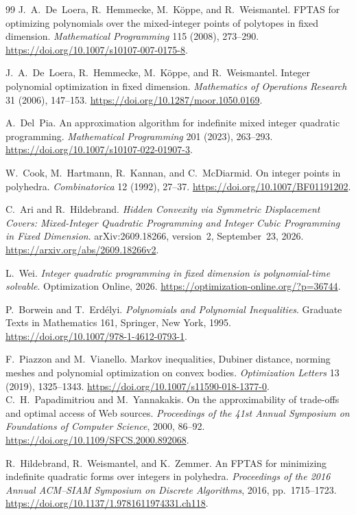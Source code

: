 \documentclass[11pt]{article}
\theoremstyle{definition}\newtheorem{definition}{Definition}[section]
\theoremstyle{remark}\newtheorem{remark}[theorem]{Remark}
\begin{document}
\begin{thebibliography}{99}
 J.~A.~De~Loera, R.~Hemmecke, M.~K\"oppe, and R.~Weismantel.
FPTAS for optimizing polynomials over the mixed-integer points of polytopes in fixed dimension.
\emph{Mathematical Programming} 115 (2008), 273--290.
\url{https://doi.org/10.1007/s10107-007-0175-8}.

 J.~A.~De~Loera, R.~Hemmecke, M.~K\"oppe, and R.~Weismantel.
Integer polynomial optimization in fixed dimension.
\emph{Mathematics of Operations Research} 31 (2006), 147--153.
\url{https://doi.org/10.1287/moor.1050.0169}.

 A.~Del~Pia.
An approximation algorithm for indefinite mixed integer quadratic programming.
\emph{Mathematical Programming} 201 (2023), 263--293.
\url{https://doi.org/10.1007/s10107-022-01907-3}.

 W.~Cook, M.~Hartmann, R.~Kannan, and C.~McDiarmid.
On integer points in polyhedra.
\emph{Combinatorica} 12 (1992), 27--37.
\url{https://doi.org/10.1007/BF01191202}.

 C.~Ari and R.~Hildebrand.
\emph{Hidden Convexity via Symmetric Displacement Covers: Mixed-Integer Quadratic Programming and Integer Cubic Programming in Fixed Dimension}.
arXiv:2609.18266, version~2, September~23, 2026.
\url{https://arxiv.org/abs/2609.18266v2}.

 L.~Wei.
\emph{Integer quadratic programming in fixed dimension is polynomial-time solvable}.
Optimization Online, 2026.
\url{https://optimization-online.org/?p=36744}.

 P.~Borwein and T.~Erd\'elyi.
\emph{Polynomials and Polynomial Inequalities}. Graduate Texts in Mathematics 161, Springer, New York, 1995.
\url{https://doi.org/10.1007/978-1-4612-0793-1}.

 F.~Piazzon and M.~Vianello.
Markov inequalities, Dubiner distance, norming meshes and polynomial optimization on convex bodies.
\emph{Optimization Letters} 13 (2019), 1325--1343.
\url{https://doi.org/10.1007/s11590-018-1377-0}.
 C.~H.~Papadimitriou and M.~Yannakakis.
On the approximability of trade-offs and optimal access of Web sources.
\emph{Proceedings of the 41st Annual Symposium on Foundations of Computer Science}, 2000, 86--92.
\url{https://doi.org/10.1109/SFCS.2000.892068}.

 R.~Hildebrand, R.~Weismantel, and K.~Zemmer.
An FPTAS for minimizing indefinite quadratic forms over integers in polyhedra.
\emph{Proceedings of the 2016 Annual ACM--SIAM Symposium on Discrete Algorithms}, 2016, pp.~1715--1723.
\url{https://doi.org/10.1137/1.9781611974331.ch118}.


\end{thebibliography}
\end{document}
